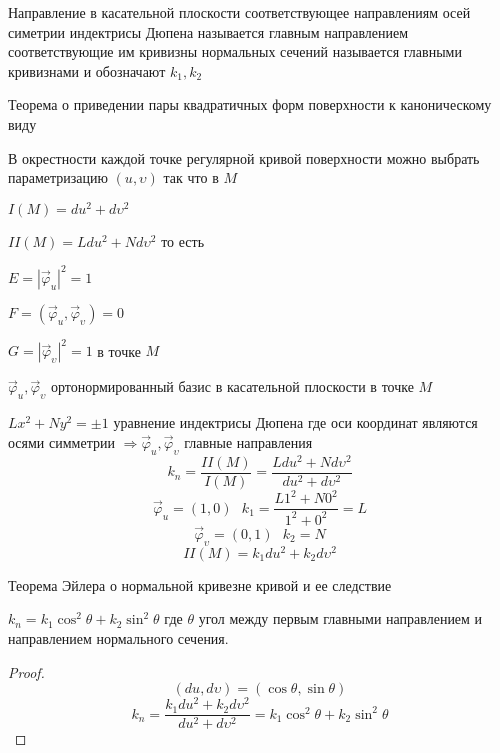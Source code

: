 \begin{define}
  Направление в касательной плоскости соответствующее направлениям осей симетрии
  индектрисы Дюпена называется главным направлением соответствующие им кривизны
  нормальных сечений называется главными кривизнами и обозначают $k_1, k_2$
\end{define}

\begin{title}[\Large]
  Теорема о приведении пары квадратичных форм поверхности к каноническому виду
\end{title}

\begin{theorem}
  В окрестности каждой точке регулярной кривой поверхности можно выбрать
  параметризацию $(u, \upsilon)$ так что в $M$

  $I(M) = du^2 + d\upsilon^2$

  $II(M) = Ldu^2 + Nd\upsilon^2$ то есть

  $E = |\vec \varphi_u|^2 = 1$

  $F = (\vec \varphi_u, \vec \varphi_{\upsilon}) = 0$

  $G = |\vec \varphi_{\upsilon}|^2 = 1$ в точке $M$

  $\vec \varphi_u, \vec \varphi_{\upsilon}$ ортонормированный базис в
  касательной плоскости в точке $M$

  $Lx^2 + Ny^2 = \pm 1$ уравнение индектрисы Дюпена где оси координат являются
  осями симметрии $\Rightarrow \vec \varphi_u, \vec \varphi_{\upsilon}$ главные
  направления
  $$
  k_n = \frac{II(M)}{I(M)} = \frac{Ldu^2 + Nd\upsilon^2}{du^2 + d\upsilon^2}
  $$
  $$
  \vec \varphi_u = (1,0) ~~~ k_1 = \frac{L 1^2 + N 0^2}{1^2 + 0^2} = L
  $$
  $$
  \vec \varphi_{\upsilon} = (0,1) ~~~ k_2 = N
  $$
  $$
  II(M) = k_1 du^2 + k_2 d\upsilon^2
  $$
\end{theorem}

\begin{title}[\Large]
  Теорема Эйлера о нормальной кривезне кривой и ее следствие
\end{title}

\begin{theorem}[Эйлера]
  $k_n = k_1 \cos^2 \theta + k_2 \sin^2 \theta$ где $\theta$ угол между первым
  главными направлением и направлением нормального сечения.
\end{theorem}

\begin{proof}
  $$
  (du, d\upsilon) = (\cos \theta, \sin \theta)
  $$
  $$
  k_n = \frac{k_1du^2 + k_2d\upsilon^2}{du^2 + d\upsilon^2} = k_1\cos^2 \theta
  + k_2 \sin^2 \theta
  $$
\end{proof}

